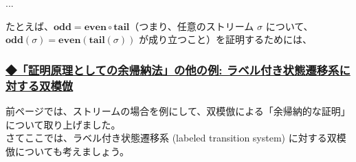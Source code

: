 \documentclass[
		head_space=20mm,
		foot_space=20mm,
		gutter=10mm,
		line_length=190mm
]{jlreq}
\begin{document}
\begin{definition}
	... 
\end{definition}

\noindent たとえば、$\mathbf{odd}=\mathbf{even}\circ\mathbf{tail}$（つまり、任意のストリーム $\sigma$ について、$\mathbf{odd}(\sigma)=\mathbf{even}(\mathbf{tail}(\sigma))$ が成り立つこと）を証明するためには、


\clearpage

\subsubsection*{\underline{◆「証明原理としての余帰納法」の他の例: ラベル付き状態遷移系に対する双模倣}} \vspace{3pt}

\noindent 前ページでは、ストリームの場合を例にして、双模倣による「余帰納的な証明」について取り上げました。\\
さてここでは、ラベル付き状態遷移系 (labeled transition system) に対する双模倣についても考えましょう。
\end{document}
